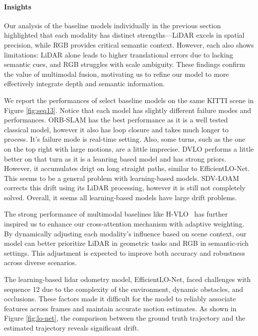 \documentclass[11pt,a4paper]{article}
\begin{document}
\paragraph{Insights}

Our analysis of the baseline models individually in the previous section highlighted that each modality has distinct strengths—LiDAR excels in spatial precision, while RGB provides critical semantic context. However, each also shows limitations: LiDAR alone leads to higher translational errors due to lacking semantic cues, and RGB struggles with scale ambiguity. These findings confirm the value of multimodal fusion, motivating us to refine our model to more effectively integrate depth and semantic information. 

We report the performances of select baseline models on the same KITTI scene in Figure \ref{fig:seq13}. Notice that each model has slightly different failure modes and performances. ORB-SLAM has the best performance as it is a well tested classical model, however it also has loop closure and takes much longer to process. It's failure mode is real-time setting. Also, some turns, such as the one on the top right with large motions, are a little imprecise. DVLO performs a little better on that turn as it is a leanring based model and has strong priors. However, it accumulates drigt on long straight paths, similar to EfficientLO-Net. This seems to be a general problem with learning-based models. SDV-LOAM corrects this drift using its LiDAR processing, however it is still not completely solved. Overall, it seems all learning-based models have large drift problems.

The strong performance of multimodal baselines like H-VLO~\cite{hvlo} has further inspired us to enhance our cross-attention mechanism with adaptive weighting. By dynamically adjusting each modality’s influence based on scene context, our model can better prioritize LiDAR in geometric tasks and RGB in semantic-rich settings. This adjustment is expected to improve both accuracy and robustness across diverse scenarios.

The learning-based lidar odometry model, EfficientLO-Net, faced challenges with sequence 12 due to the complexity of the environment, dynamic obstacles, and occlusions. These factors made it difficult for the model to reliably associate features across frames and maintain accurate motion estimates. As shown in Figure \ref{fig:lo-net}, the comparison between the ground truth trajectory and the estimated trajectory reveals significant drift.
\end{document}
